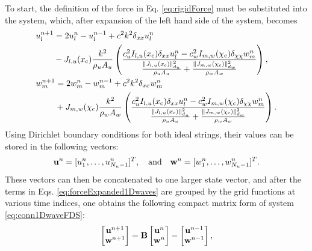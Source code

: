 To start, the definition of the force in Eq. \eqref{eq:rigidForce} must be substituted into the system, which, after expansion of the left hand side of the system, becomes
\begin{subequations}\label{eq:forceExpanded1Dwaves}
    \begin{align}
        &\begin{aligned}
            u_l^{n+1} &= 2u_l^n - u_l^{n-1} + c^2k^2\delta_{xx} u_l^n \\
            &- J_{l, u}(x_{\text{c}})\frac{k^2}{\rho_u A_u} \left(\frac{c_u^2 I_{l, u}(x_{\text{c}})\delta_{xx} u_l^n - c_w^2 I_{m, w}(\chi_{\text{c}})\delta_{\chi\chi} w_m^n}{\frac{\lVert J_{l, u}(x_{\text{c}})\rVert_{d_u}^2}{\rho_u A_u} + \frac{\lVert J_{m, w}(\chi_{\text{c}})\rVert_{d_w}^2}{\rho_w A_w}}\right), 
        \end{aligned}\\
        &\begin{aligned}
            w_m^{n+1} &= 2w_m^n - w_m^{n-1} + c^2k^2\delta_{xx} w_m^n \\
            &+ J_{m, w}(\chi_{\text{c}})\frac{k^2}{\rho_w A_w} \left(\frac{c_u^2 I_{l, u}(x_{\text{c}})\delta_{xx} u_l^n - c_w^2 I_{m, w}(\chi_{\text{c}})\delta_{\chi\chi} w_m^n}{\frac{\lVert J_{l, u}(x_{\text{c}})\rVert_{d_u}^2}{\rho_u A_u} + \frac{\lVert J_{m, w}(\chi_{\text{c}})\rVert_{d_w}^2}{\rho_w A_w}}\right).
        \end{aligned}
    \end{align}
\end{subequations}
Using Dirichlet boundary conditions for both ideal strings, their values can be stored in the following vectors:
\begin{equation*}
    \mathbf{u}^n =[u_1^n, \hdots, u_{N_u-1}^n]^T, \quad \text{and} \quad \mathbf{w}^n =[w_1^n, \hdots, w_{N_u-1}^n]^T.
\end{equation*}
These vectors can then be concatenated to one larger state vector, and after the terms in Eqs. \eqref{eq:forceExpanded1Dwaves} are grouped by the grid functions at various time indices, one obtains the following compact matrix form of system \eqref{eq:conn1DwaveFDS}:
\begin{equation}\label{eq:conn1DwaveMatrix} 
    \begin{bmatrix}
        \mathbf{u}^{n+1}\\
        \mathbf{w}^{n+1}
    \end{bmatrix} = \mathbf{B} \begin{bmatrix}
        \mathbf{u}^n\\
        \mathbf{w}^n
    \end{bmatrix} - \begin{bmatrix}
        \mathbf{u}^{n-1}\\
        \mathbf{w}^{n-1}
    \end{bmatrix},
\end{equation}
